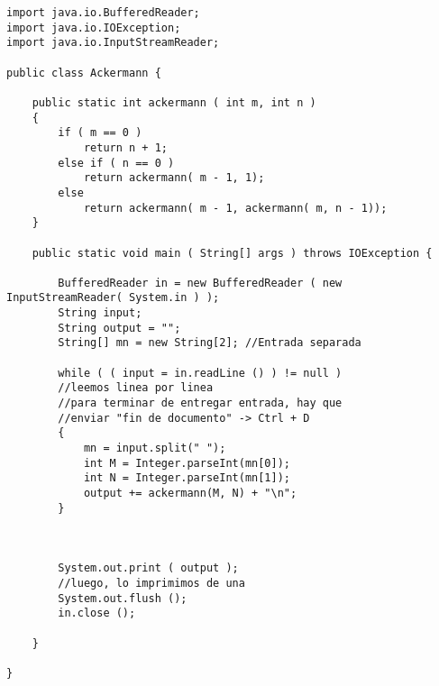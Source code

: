 \documentclass[11pt,spanish]{article}
\begin{document}
\begin{verbatim}
import java.io.BufferedReader;
import java.io.IOException;
import java.io.InputStreamReader;

public class Ackermann {

    public static int ackermann ( int m, int n )
    {
        if ( m == 0 )
            return n + 1;
        else if ( n == 0 )
            return ackermann( m - 1, 1);
        else
            return ackermann( m - 1, ackermann( m, n - 1));
    }

    public static void main ( String[] args ) throws IOException {

        BufferedReader in = new BufferedReader ( new InputStreamReader( System.in ) );
        String input;
        String output = "";
        String[] mn = new String[2]; //Entrada separada

        while ( ( input = in.readLine () ) != null )
        //leemos linea por linea
        //para terminar de entregar entrada, hay que
        //enviar "fin de documento" -> Ctrl + D
        {
            mn = input.split(" ");
            int M = Integer.parseInt(mn[0]);
            int N = Integer.parseInt(mn[1]);
            output += ackermann(M, N) + "\n";
        }



        System.out.print ( output );
        //luego, lo imprimimos de una
        System.out.flush ();
        in.close ();

    }

}
\end{verbatim}
\end{document}
